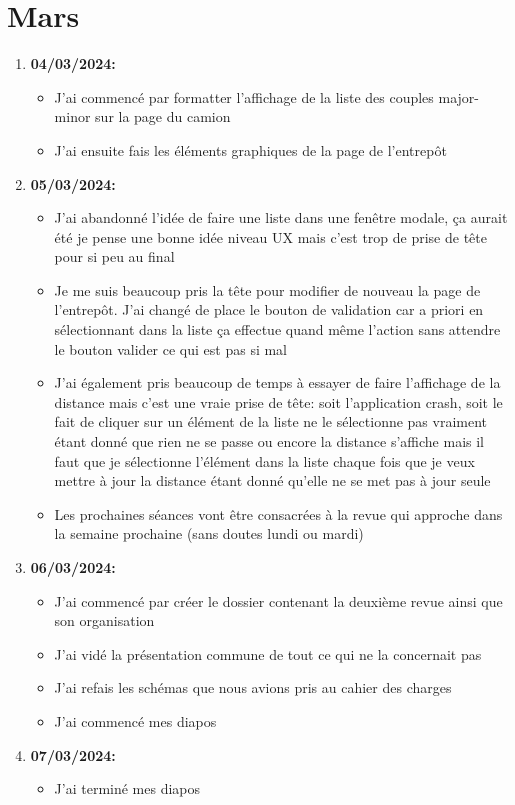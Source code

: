 \documentclass[10pt,a4paper]{book}
\begin{document}
\chapter{Mars}

\begin{enumerate}
    \item \textbf{04/03/2024:}
        \begin{itemize}
            \item J'ai commencé par formatter l'affichage de la liste des couples major-minor sur la page du camion
            \item J'ai ensuite fais les éléments graphiques de la page de l'entrepôt
        \end{itemize}
    \item \textbf{05/03/2024:}
        \begin{itemize}
            \item J'ai abandonné l'idée de faire une liste dans une fenêtre modale, ça aurait été je pense une bonne idée niveau UX mais c'est trop de prise de tête pour si peu au final
            \item Je me suis beaucoup pris la tête pour modifier de nouveau la page de l'entrepôt. J'ai changé de place le bouton de validation car a priori en sélectionnant dans la liste ça effectue quand même l'action sans attendre le bouton valider ce qui est pas si mal
            \item J'ai également pris beaucoup de temps à essayer de faire l'affichage de la distance mais c'est une vraie prise de tête: soit l'application crash, soit le fait de cliquer sur un élément de la liste ne le sélectionne pas vraiment étant donné que rien ne se passe ou encore la distance s'affiche mais il faut que je sélectionne l'élément dans la liste chaque fois que je veux mettre à jour la distance étant donné qu'elle ne se met pas à jour seule
            \item Les prochaines séances vont être consacrées à la revue qui approche dans la semaine prochaine (sans doutes lundi ou mardi)
        \end{itemize}
    \item \textbf{06/03/2024:}
        \begin{itemize}
            \item J'ai commencé par créer le dossier contenant la deuxième revue ainsi que son organisation
            \item J'ai vidé la présentation commune de tout ce qui ne la concernait pas
            \item J'ai refais les schémas que nous avions pris au cahier des charges
            \item J'ai commencé mes diapos
        \end{itemize}
    \item \textbf{07/03/2024:}
        \begin{itemize}
            \item J'ai terminé mes diapos
        \end{itemize}
\end{enumerate}
\end{document}
